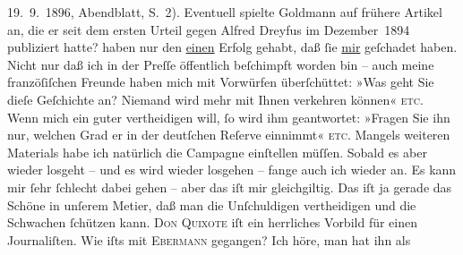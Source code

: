 \begin{ledgroupsized}[t]{13cm}
{{{                        19. 9. 1896, Abendblatt, S. 2). Eventuell spielte Goldmann auf frühere Artikel an, die er seit
                  dem ersten Urteil gegen Alfred Dreyfus im
                     Dezember 1894 publiziert hatte?}}}\label{K_L02786-4h} haben nur
               den \uline{einen} Erfolg gehabt, daß ſie \uline{mir} geſchadet haben. Nicht nur daß ich in der Preſſe öffentlich
               beſchimpft worden bin – auch meine franzöſiſchen Freunde haben mich mit Vorwürfen überſchüttet: »Was geht Sie
               dieſe Geſchichte an? Niemand wird mehr mit Ihnen verkehren können« \textsc{etc.} Wenn mich ein guter {\pb}\label{K_L02786-5v}\label{K_L02786-5h} vertheidigen will, ſo wird ihm geantwortet: »Fragen Sie ihn
               nur, welchen Grad er in der deutſchen Reſerve einnimmt« \textsc{etc}. Mangels weiteren
               Materials habe ich natürlich die Campagne einſtellen müſſen. Sobald es aber wieder
               losgeht – und es wird wieder losgehen – fange auch ich wieder an. Es kann mir ſehr
               ſchlecht dabei gehen – aber das iſt  mir
               gleichgiltig. Das iſt ja gerade das Schöne in unſerem Metier, daß {\pb}man die Unſchuldigen vertheidigen und die Schwachen
               ſchützen kann. \textsc{Don Quixote} iſt ein herrliches Vorbild für einen 
               Journaliſten.\pend
           \pstart
           Wie iſts mit \textsc{Ebermann} gegangen? Ich höre, man hat ihn als \label{K_L02786-6v}
\end{ledgroupsized}
